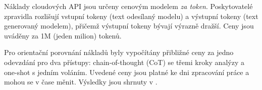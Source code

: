Náklady cloudových API jsou určeny cenovým modelem \textit{za token}.
Poskytovatelé zpravidla rozlišují vstupní tokeny (text odesílaný modelu) a výstupní tokeny (text generovaný modelem), přičemž výstupní tokeny bývají výrazně dražší.
Ceny jsou uváděny za 1M (jeden milion) tokenů.


%
\newcommand{\chainInToks}{9053}
\newcommand{\chainOutToks}{5149}
\newcommand{\oneshotInToks}{2043}
\newcommand{\oneshotOutToks}{501}

\newcommand{\computecost}[4]{%
  \begingroup
  \pgfkeys{/pgf/fpu, /pgf/fpu/output format=fixed}%
  \pgfmathparse{(#3 * (#1 / 1000000)) + (#4 * (#2 / 1000000))}%
  \pgfmathsetmacro{\myresult}{\pgfmathresult}%
  \pgfkeys{/pgf/fpu=false}%
  \pgfkeys{/pgf/number format/.cd, use comma, fixed, precision=4}%
  \pgfmathprintnumber{\myresult}%
  \endgroup
}

\newcommand{\computeCostCOT}[2]{%
  \computecost{#1}{#2}{\chainInToks}{\chainOutToks}%
}

\newcommand{\computeCostOS}[2]{%
  \computecost{#1}{#2}{\oneshotInToks}{\oneshotOutToks}%
}

Pro orientační porovnání nákladů byly vypočítány přibližné ceny za jedno odevzdání pro dva přístupy: chain-of-thought (CoT) se třemi kroky analýzy a one-shot s jedním voláním.
Uvedené ceny jsou platné ke dni zpracování práce a mohou se v čase měnit.
Výsledky jsou shrnuty v .

